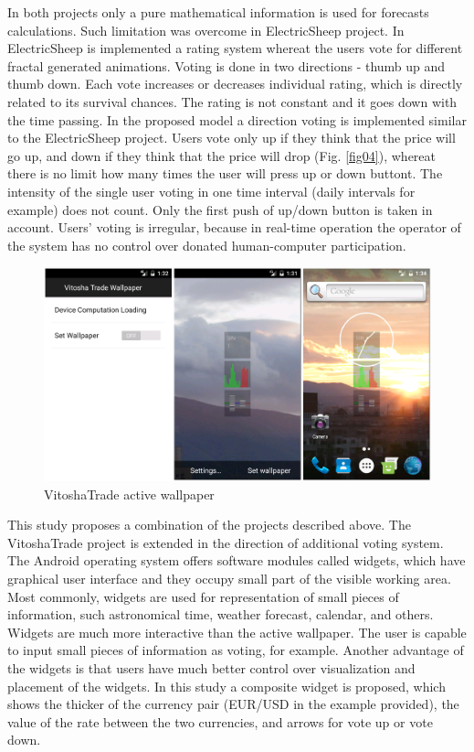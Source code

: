 \documentclass[runningheads]{llncs}
\begin{document}
In both projects only a pure mathematical information is used for forecasts calculations. Such limitation was overcome in ElectricSheep \cite{draves01} project. In ElectricSheep is implemented a rating system whereat the users vote for different fractal generated animations. Voting is done in two directions - thumb up and thumb down. Each vote increases or decreases individual rating, which is directly related to its survival chances. The rating is not constant and it goes down with the time passing. In the proposed model a direction voting is implemented similar to the ElectricSheep project. Users vote only up if they think that the price will go up, and down if they think that the price will drop (Fig. \ref{fig04}), whereat there is no limit how many times the user will press up or down buttont. The intensity of the single user voting in one time interval (daily intervals for example) does not count. Only the first push of up/down button is taken in account. Users' voting is irregular, because in real-time operation the operator of the system has no control over donated human-computer participation. 

\begin{figure}
\includegraphics[width=1.0\textwidth]{fig02.png}
\centering
\caption{VitoshaTrade active wallpaper} \label{fig02}
\end{figure}
\FloatBarrier

This study proposes a combination of the projects described above. The VitoshaTrade \cite{balabanov01} project is extended in the direction of additional voting system. The Android operating system offers software modules called widgets, which have graphical user interface and they occupy small part of the visible working area. Most commonly, widgets are used for representation of small pieces of information, such astronomical time, weather forecast, calendar, and others. Widgets are much more interactive than the active wallpaper. The user is capable to input small pieces of information as voting, for example. Another advantage of the widgets is that users have much better control over visualization and placement of the widgets. In this study a composite widget is proposed, which shows the thicker of the currency pair (EUR/USD in the example provided), the value of the rate between the two currencies, and arrows for vote up or vote down. 
\end{document}
